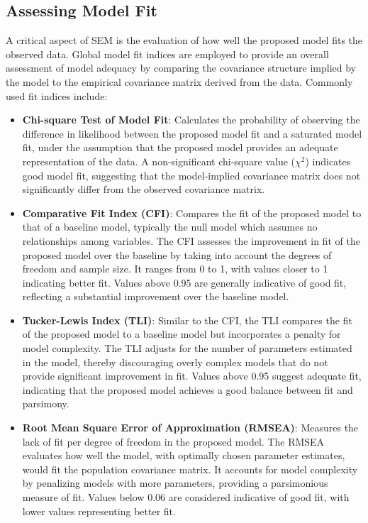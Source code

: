 \documentclass[floatsintext,a4paper]{apa7} %
\begin{document}
	\subsection{Assessing Model Fit}
	
	A critical aspect of SEM is the evaluation of how well the proposed model fits the observed data. Global model fit indices are employed to provide an overall assessment of model adequacy by comparing the covariance structure implied by the model to the empirical covariance matrix derived from the data. Commonly used fit indices include:
	
	\begin{itemize}
		\item \textbf{Chi-square Test of Model Fit}: Calculates the probability of observing the difference in likelihood between the proposed model fit and a saturated model fit, under the assumption that the proposed model provides an adequate representation of the data. A non-significant chi-square value ($\chi^2$) indicates good model fit, suggesting that the model-implied covariance matrix does not significantly differ from the observed covariance matrix.
		
		\item \textbf{Comparative Fit Index (CFI)}: Compares the fit of the proposed model to that of a baseline model, typically the null model which assumes no relationships among variables. The CFI assesses the improvement in fit of the proposed model over the baseline by taking into account the degrees of freedom and sample size. It ranges from 0 to 1, with values closer to 1 indicating better fit. Values above 0.95 are generally indicative of good fit, reflecting a substantial improvement over the baseline model.
		
		\item \textbf{Tucker-Lewis Index (TLI)}: Similar to the CFI, the TLI compares the fit of the proposed model to a baseline model but incorporates a penalty for model complexity. The TLI adjusts for the number of parameters estimated in the model, thereby discouraging overly complex models that do not provide significant improvement in fit. Values above 0.95 suggest adequate fit, indicating that the proposed model achieves a good balance between fit and parsimony.
		
		\item \textbf{Root Mean Square Error of Approximation (RMSEA)}: Measures the lack of fit per degree of freedom in the proposed model. The RMSEA evaluates how well the model, with optimally chosen parameter estimates, would fit the population covariance matrix. It accounts for model complexity by penalizing models with more parameters, providing a parsimonious measure of fit. Values below 0.06 are considered indicative of good fit, with lower values representing better fit.
		

\end{itemize}
\end{document}
